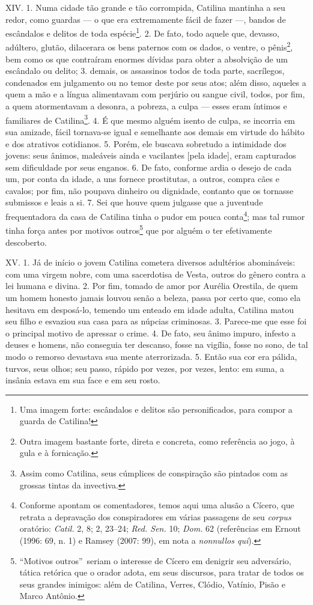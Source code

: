 XIV. 1. Numa cidade tão grande e tão corrompida, Catilina mantinha a seu redor,
como guardas --- o que era extremamente fácil de fazer ---, bandos de
escândalos e delitos de toda espécie\footnote{Uma imagem forte: escândalos e
delitos são personificados, para compor a guarda de Catilina!}. 2. De fato,
todo aquele que, devasso, adúltero, glutão, dilacerara os bens paternos com os
dados, o ventre, o pênis\footnote{Outra imagem bastante forte, direta e
concreta, como referência ao jogo, à gula e à fornicação.}, bem como os que contraíram enormes dívidas para obter a absolvição
de um escândalo ou delito; 3. demais, os assassinos todos de toda parte,
sacrílegos, condenados em julgamento ou no temor deste por seus atos; além
disso, aqueles a quem a mão e a língua alimentavam com perjúrio ou sangue
civil, todos, por fim, a quem atormentavam a desonra, a pobreza, a culpa ---
esses eram íntimos e familiares de Catilina\footnote{Assim como Catilina, seus
cúmplices de conspiração são pintados com as grossas tintas da invectiva.}. 4.
É que mesmo alguém isento de culpa, se incorria em sua amizade, fácil
tornava-se igual e semelhante aos demais em virtude do hábito e dos atrativos
cotidianos. 5. Porém, ele buscava sobretudo a intimidade dos jovens: seus
ânimos, maleáveis ainda e vacilantes [pela idade], eram capturados sem
dificuldade por seus enganos. 6. De fato, conforme ardia o desejo de cada um, 
por conta da idade, a uns fornece prostitutas, a outros, compra cães e cavalos; por
fim, não poupava dinheiro ou dignidade, contanto que os tornasse submissos e
leais a si. 7. Sei que houve quem julgasse que a juventude frequentadora da
casa de Catilina tinha o pudor em pouca conta\footnote{Conforme apontam os
comentadores, temos aqui uma alusão a Cícero, que retrata a depravação dos
conspiradores em várias passagens de seu \emph{corpus} oratório:
\emph{Catil.} 2, 8; 2, 23--24; \emph{Red. Sen.} 10; \emph{Dom.} 62 (referências em Ernout
(1996: 69, n. 1) e Ramsey (2007: 99), em nota a \emph{nonnullos qui}).};
mas tal rumor tinha força antes por motivos outros\footnote{``Motivos outros''\
seriam o interesse de Cícero em denigrir seu adversário, tática retórica que o
orador adota, em seus discursos, para tratar de todos os seus grandes inimigos:
além de Catilina, Verres, Clódio, Vatínio, Pisão e Marco Antônio.} que por
alguém o ter efetivamente descoberto.

XV. 1. Já de início o jovem Catilina cometera diversos adultérios abomináveis:
com uma virgem nobre, com uma sacerdotisa de Vesta, outros do gênero contra a
lei humana e divina. 2. Por fim, tomado de amor por Aurélia Orestila, de quem
um homem honesto jamais louvou senão a beleza, passa por certo que, como
ela hesitava em desposá-lo, temendo um enteado em idade adulta, Catilina matou
seu filho e esvaziou sua casa para as núpcias criminosas. 3. Parece-me que esse
foi o principal motivo de apressar o crime. 4. De fato, seu ânimo impuro,
infesto a deuses e homens, não conseguia ter descanso, fosse na vigília, fosse
no sono, de tal modo o remorso devastava sua mente aterrorizada. 5. Então sua
cor era pálida, turvos, seus olhos; seu passo, rápido por vezes, por vezes,
lento: em suma, a insânia estava em sua face e em seu rosto. 

